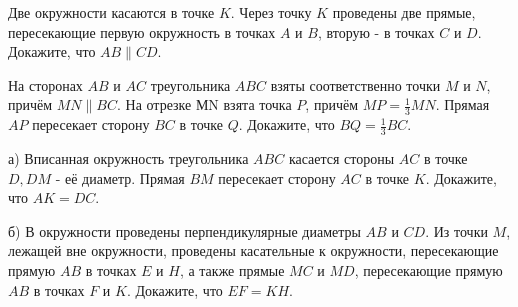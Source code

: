 \newpage

\hspace{3mm}

Две окружности касаются в точке $K$. Через точку $K$ проведены две прямые, пересекающие первую окружность в точках $A$ и $B$, вторую - в точках $C$ и $D$. Докажите, что $A B \| C D$.

На сторонах $A B$ и $A C$ треугольника $A B C$ взяты соответственно точки $M$ и $N$, причём $M N \| B C$. На отрезке МN взята точка $P$, причём $M P=\frac{1}{3} M N$. Прямая $A P$ пересекает сторону $B C$ в точке $Q$. Докажите, что $B Q=\frac{1}{3} B C$.

а) Вписанная окружность треугольника $A B C$ касается стороны $A C$ в точке $D, D M$ - её диаметр. Прямая $B M$ пересекает сторону $A C$ в точке $K$. Докажите, что $A K=D C$.

\noindent
б) В окружности проведены перпендикулярные диаметры $A B$ и $C D$. Из точки $M$, лежащей вне окружности, проведены касательные к окружности, пересекающие прямую $A B$ в точках $E$ и $H$, а также прямые $M C$ и $M D$, пересекающие прямую $A B$ в точках $F$ и $K$. Докажите, что $E F=K H$.